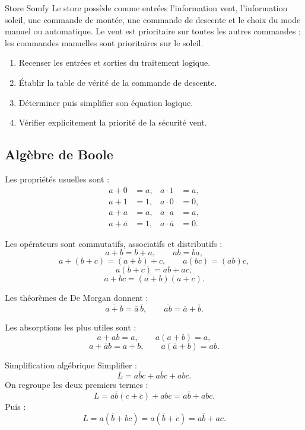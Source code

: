 \begin{TLLogicApplication}{Store Somfy}
Le store possède comme entrées l'information vent, l'information soleil, une commande de montée, une commande de descente et le choix du mode manuel ou automatique. Le vent est prioritaire sur toutes les autres commandes ; les commandes manuelles sont prioritaires sur le soleil.
\begin{enumerate}
  \item Recenser les entrées et sorties du traitement logique.
  \item Établir la table de vérité de la commande de descente.
  \item Déterminer puis simplifier son équation logique.
  \item Vérifier explicitement la priorité de la sécurité vent.
\end{enumerate}
\end{TLLogicApplication}

\subsection{Algèbre de Boole}

Les propriétés usuelles sont :
\[
\begin{aligned}
a+0&=a, & a\cdot1&=a,\\
a+1&=1, & a\cdot0&=0,\\
a+a&=a, & a\cdot a&=a,\\
a+\overline a&=1, & a\cdot\overline a&=0.
\end{aligned}
\]

Les opérateurs sont commutatifs, associatifs et distributifs :
\[
a+b=b+a,\qquad ab=ba,
\]
\[
a+(b+c)=(a+b)+c,\qquad a(bc)=(ab)c,
\]
\[
a(b+c)=ab+ac,
\]
\[
a+bc=(a+b)(a+c).
\]

Les théorèmes de De Morgan donnent :
\[
\boxed{\overline{a+b}=\overline a\,\overline b,}
\qquad
\boxed{\overline{ab}=\overline a+\overline b.}
\]

Les absorptions les plus utiles sont :
\[
a+ab=a,
\qquad
a(a+b)=a,
\]
\[
a+\overline a b=a+b,
\qquad
a(\overline a+b)=ab.
\]

\begin{TLLogicApplication}{Simplification algébrique}
Simplifier :
\[
L=a\overline bc+a\overline b\overline c+abc.
\]
On regroupe les deux premiers termes :
\[
L=a\overline b(c+\overline c)+abc=a\overline b+abc.
\]
Puis :
\[
L=a(\overline b+bc)=a(\overline b+c)=\boxed{a\overline b+ac}.
\]
\end{TLLogicApplication}

